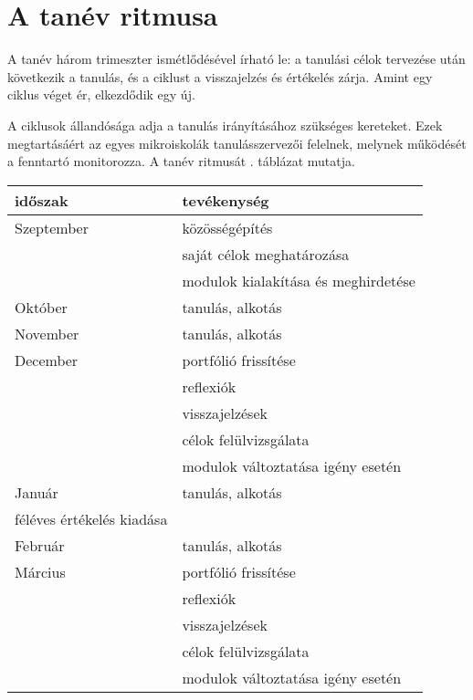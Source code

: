 \section{A tanév ritmusa}
\label{sec:tanev_ritmusa}
A tanév három trimeszter ismétlődésével írható le: a tanulási célok
tervezése után következik a tanulás, és a ciklust a visszajelzés és értékelés
zárja.	Amint egy ciklus véget ér, elkezdődik egy új.

A ciklusok állandósága adja a tanulás irányításához szükséges kereteket. Ezek
megtartásáért az egyes mikroiskolák tanulásszervezői felelnek, melynek működését a
fenntartó monitorozza. A tanév ritmusát . táblázat
mutatja.

\begin{table}
  \centering
  \begin{tabular}{ l|l }
    \textbf{időszak} & \textbf{tevékenység}                \\
    \hline
    Szeptember       &
    közösségépítés                                         \\
                     & saját célok meghatározása           \\
                     & modulok kialakítása és meghirdetése
    \\ \hline

    Október          &
    tanulás, alkotás
    \\ \hline

    November         &
    tanulás, alkotás
    \\ \hline

    December         &
    portfólió frissítése                                   \\
                     & reflexiók                           \\
                     & visszajelzések                      \\
                     & célok felülvizsgálata               \\
                     & modulok változtatása igény esetén
    \\ \hline

    Január           &
    tanulás, alkotás\\
    féléves értékelés kiadása
    \\ \hline

    Február          &
    tanulás, alkotás
    \\ \hline

    Március          &
    portfólió frissítése                                   \\
                     & reflexiók                           \\
                     & visszajelzések                      \\
                     & célok felülvizsgálata               \\
                     & modulok változtatása igény esetén
    \\ \hline


\end{tabular}
\end{table}
